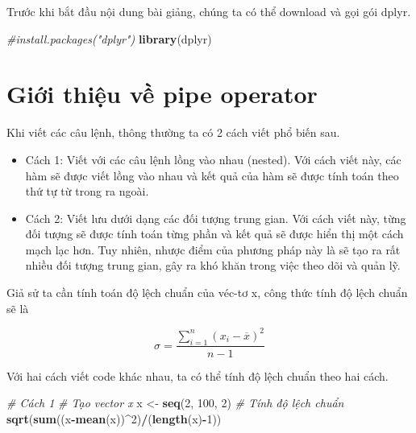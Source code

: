 \documentclass[]{krantz}
\makeatletter
\newenvironment{Shaded}{\begin{snugshade}}{\end{snugshade}}
\newcommand{\CommentTok}[1]{\textcolor[rgb]{0.37,0.37,0.37}{\textit{#1}}}
\newcommand{\DecValTok}[1]{\textcolor[rgb]{0.06,0.06,0.06}{#1}}
\newcommand{\KeywordTok}[1]{\textcolor[rgb]{0.27,0.27,0.27}{\textbf{#1}}}
\newcommand{\NormalTok}[1]{#1}
\newcommand{\OperatorTok}[1]{\textcolor[rgb]{0.43,0.43,0.43}{\textbf{#1}}}
\newcommand{\StringTok}[1]{\textcolor[rgb]{0.5,0.5,0.5}{#1}}
\newenvironment{kframe}{%
\medskip{}
\setlength{\fboxsep}{.8em}
 \def\at@end@of@kframe{}%
 \ifinner\ifhmode%
  \def\at@end@of@kframe{\end{minipage}}%
  \begin{minipage}{\columnwidth}%
 \fi\fi%
 \def\FrameCommand##1{\hskip\@totalleftmargin \hskip-\fboxsep
 \colorbox{shadecolor}{##1}\hskip-\fboxsep
     \hskip-\linewidth \hskip-\@totalleftmargin \hskip\columnwidth}%
 \MakeFramed {\advance\hsize-\width
   \@totalleftmargin\z@ \linewidth\hsize
   \@setminipage}}%
 {\par\unskip\endMakeFramed%
 \at@end@of@kframe}
\renewenvironment{Shaded}{\begin{kframe}}{\end{kframe}}
\renewenvironment{Shaded}{\begin{snugshade}}{\end{snugshade}}
\renewcommand{\CommentTok}[1]{\textcolor[rgb]{0.56,0.35,0.01}{\textit{#1}}}
\renewcommand{\DecValTok}[1]{\textcolor[rgb]{0.00,0.00,0.81}{#1}}
\renewcommand{\KeywordTok}[1]{\textcolor[rgb]{0.13,0.29,0.53}{\textbf{#1}}}
\renewcommand{\NormalTok}[1]{#1}
\renewcommand{\OperatorTok}[1]{\textcolor[rgb]{0.81,0.36,0.00}{\textbf{#1}}}
\renewcommand{\StringTok}[1]{\textcolor[rgb]{0.31,0.60,0.02}{#1}}
\theoremstyle{definition}
\theoremstyle{definition}
\theoremstyle{definition}
\theoremstyle{remark}
\makeatother
\begin{document}
Trước khi bắt đầu nội dung bài giảng, chúng ta có thể download và gọi
gói dplyr.

\begin{Shaded}
\begin{Highlighting}[]
\CommentTok{#install.packages("dplyr")}
\KeywordTok{library}\NormalTok{(dplyr)}
\end{Highlighting}
\end{Shaded}

\hypertarget{gii-thiu-v-pipe-operator}{%
\section{Giới thiệu về pipe operator}\label{gii-thiu-v-pipe-operator}}

Khi viết các câu lệnh, thông thường ta có 2 cách viết phổ biến sau.

\begin{itemize}
\item
  Cách 1: Viết với các câu lệnh lồng vào nhau (nested). Với cách viết
  này, các hàm sẽ được viết lồng vào nhau và kết quả của hàm sẽ được
  tính toán theo thứ tự từ trong ra ngoài.
\item
  Cách 2: Viết lưu dưới dạng các đối tượng trung gian. Với cách viết
  này, từng đối tượng sẽ được tính toán từng phần và kết quả sẽ được
  hiển thị một cách mạch lạc hơn. Tuy nhiên, nhược điểm của phương pháp
  này là sẽ tạo ra rất nhiều đối tượng trung gian, gây ra khó khăn trong
  việc theo dõi và quản lỹ.
\end{itemize}

Giả sử ta cần tính toán độ lệch chuẩn của véc-tơ x, công thức tính độ
lệch chuẩn sẽ là

\[\sigma = \frac{\sum_{i=1}^n(x_i-\overline{x})^2}{n-1}\]

Với hai cách viết code khác nhau, ta có thể tính độ lệch chuẩn theo hai
cách.

\begin{Shaded}
\begin{Highlighting}[]
\CommentTok{# Cách 1}
\CommentTok{# Tạo vector x}
\NormalTok{x <-}\StringTok{ }\KeywordTok{seq}\NormalTok{(}\DecValTok{2}\NormalTok{, }\DecValTok{100}\NormalTok{, }\DecValTok{2}\NormalTok{)  }
\CommentTok{# Tính độ lệch chuẩn}
\KeywordTok{sqrt}\NormalTok{(}\KeywordTok{sum}\NormalTok{((x}\OperatorTok{-}\KeywordTok{mean}\NormalTok{(x))}\OperatorTok{^}\DecValTok{2}\NormalTok{)}\OperatorTok{/}\NormalTok{(}\KeywordTok{length}\NormalTok{(x)}\OperatorTok{-}\DecValTok{1}\NormalTok{))}
\end{Highlighting}
\end{Shaded}
\end{document}
